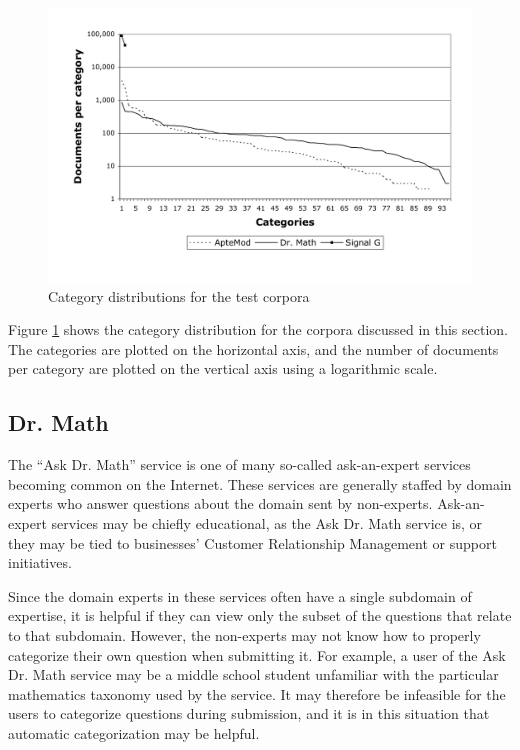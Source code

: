 \begin{figure}
\begin{center}
\includegraphics[width=\linewidth]{figures/Corpora-catdist.pdf}
\caption{Category distributions for the test corpora}
\label{Corpora-catdist}
\end{center}
\end{figure}

Figure \ref{Corpora-catdist} shows the category distribution for
the corpora discussed in this section.  The categories are plotted on
the horizontal axis, and the number of documents per category are
plotted on the vertical axis using a logarithmic scale.


\subsection{Dr. Math}

The ``Ask Dr. Math'' service \cite{drmath} is one of many so-called
ask-an-expert services becoming common on the Internet.  These
services are generally staffed by domain experts who answer questions
about the domain sent by non-experts.  Ask-an-expert services may be
chiefly educational, as the Ask Dr. Math service is, or they may be
tied to businesses' Customer Relationship Management or support
initiatives.

Since the domain experts in these services often have a single
subdomain of expertise, it is helpful if they can view only the subset
of the questions that relate to that subdomain.  However, the
non-experts may not know how to properly categorize their own question
when submitting it.  For example, a user of the Ask Dr. Math service
may be a middle school student unfamiliar with the particular
mathematics taxonomy used by the service.  It may therefore be
infeasible for the users to categorize questions during submission,
and it is in this situation that automatic categorization may be
helpful.

